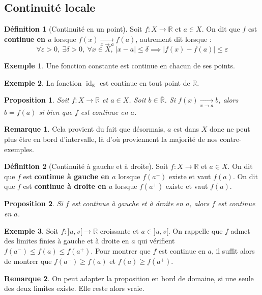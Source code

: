 \documentclass[french]{book}
\newcommand{\R}{\mathbb{R}}
\theoremstyle{plain}
\newtheorem{prop}{Proposition}[chapter]
\theoremstyle{definition}
\newtheorem{dfn}{Définition}[chapter]
\newtheorem{exa}{Exemple}[chapter]
\newtheorem{rmq}{Remarque}[chapter]
\theoremstyle{remark}
\DeclareMathOperator{\id}{id}
\begin{document}
\subsection{Continuité locale}
\begin{dfn}[Continuité en un point]
	Soit $f:X\rightarrow\R$ et $a\in X$. On dit que $f$ est \textbf{continue en $a$} lorsque $f(x)\xrightarrow[x\to a]{}f(a)$, autrement dit lorsque : $$\forall \varepsilon>0,\ \exists \delta>0,\ \forall x\in X,\ \lvert x-a\rvert\leqslant\delta\implies\lvert f(x)-f(a)\rvert\leqslant\varepsilon$$
\end{dfn}
\begin{exa}
	Une fonction constante est continue en chacun de ses points.
\end{exa}
\begin{exa}
	La fonction $\id_\R$ est continue en tout point de $\R$.
\end{exa}
\begin{prop}
	Soit $f:X\rightarrow\R$ et $a\in X$. Soit $b\in\overline{\R}$. Si $f(x)\xrightarrow[x\to a]{}b$, alors $b=f(a)$ si bien que $f$ est continue en $a$.
\end{prop}
\begin{rmq}
	Cela provient du fait que désormais, $a$ est dans $X$ donc ne peut plus être en bord d'intervalle, là d'où proviennent la majorité de nos contre-exemples.
\end{rmq}
\begin{dfn}[Continuité à gauche et à droite]
	Soit $f:X\rightarrow\R$ et $a\in X$. On dit que $f$ est \textbf{continue à gauche en $a$} lorsque $f(a^-)$ existe et vaut $f(a)$. On dit que $f$ est \textbf{continue à droite en $a$} lorsque $f(a^+)$ existe et vaut $f(a)$.
\end{dfn}
\begin{prop}
	Si $f$ est continue à gauche et à droite en $a$, alors $f$ est continue en $a$.
\end{prop}
\begin{exa}
	Soit $f:]u,v[\rightarrow\R$ croissante et $a\in]u,v[$. On rappelle que $f$ admet des limites finies à gauche et à droite en $a$ qui vérifient $f(a^-)\leqslant f(a)\leqslant f(a^+)$. Pour montrer que $f$ est continue en $a$, il suffit alors de montrer que $f(a^-)\geqslant f(a)$ et $f(a)\geqslant f(a^+)$.
\end{exa}
\begin{rmq}
	On peut adapter la proposition en bord de domaine, si une seule des deux limites existe. Elle reste alors vraie.
\end{rmq}
\end{document}
